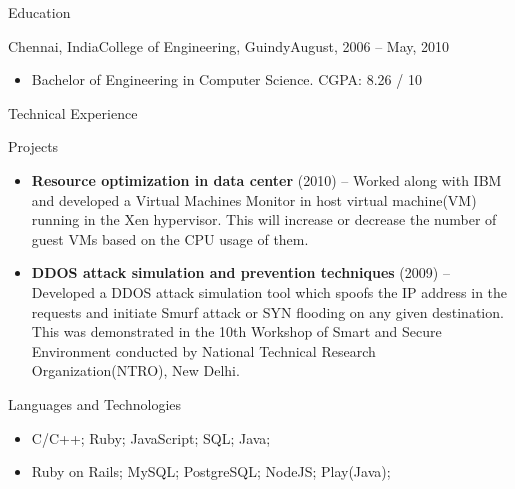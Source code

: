 \documentclass[]{mcdowellcv}
\begin{document}
	\begin{cvsection}{Education}
		\begin{cvsubsection}{Chennai, India}{College of Engineering, Guindy}{August, 2006 --  May, 2010}
		
			\begin{itemize}
			\end{itemize}
			\begin{itemize}
				\item Bachelor of Engineering in Computer Science. {      }{      }{      }{      } {      }{      }{      }{      } {      }{      }{      }{      } {      }{      }{      }{      } {      }{      }{      }{      } {      }{      }{      }{      } {      }{      }{      }{      } {      }{      }{      }{      }  {      }{      }{      }{      } {      }{      }{      }{      } {      }{      }{      }{      } {      }CGPA: 8.26 / 10
			\end{itemize}
		\end{cvsubsection}
	\end{cvsection}
		\begin{cvsection}{Technical Experience}
		\begin{cvsubsection}{Projects}{}{}
			\begin{itemize}
				\item \textbf{Resource optimization in data center} (2010) -- Worked along with IBM and developed a Virtual Machines Monitor in host virtual machine(VM) running in the Xen hypervisor. This will increase or decrease the number of guest VMs based on the CPU usage of them.
				\item \textbf{DDOS attack simulation and prevention techniques} (2009) -- Developed a DDOS attack simulation tool which spoofs the IP address in the requests and initiate Smurf attack or SYN flooding on any given destination. This was demonstrated in the 10th Workshop of
Smart and Secure Environment conducted by National Technical Research Organization(NTRO), New Delhi.
			\end{itemize}
		\end{cvsubsection}
	\end{cvsection}

	\begin{cvsection}{Languages and Technologies}
		\begin{cvsubsection}{}{}{}
			\begin{itemize}
				\item C/C++; Ruby; JavaScript; SQL; Java;
				\item Ruby on Rails; MySQL; PostgreSQL; NodeJS; Play(Java);
			\end{itemize}
		\end{cvsubsection}
	\end{cvsection}
\end{document}
